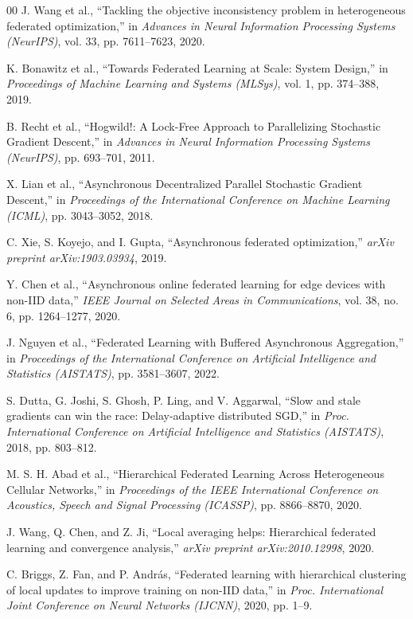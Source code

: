 \documentclass[conference]{IEEEtran}
\begin{document}
\begin{thebibliography}{00}
 J. Wang et al., ``Tackling the objective inconsistency problem in heterogeneous federated optimization,'' in \textit{Advances in Neural Information Processing Systems (NeurIPS)}, vol. 33, pp. 7611--7623, 2020.

 K. Bonawitz et al., ``Towards Federated Learning at Scale: System Design,'' in \textit{Proceedings of Machine Learning and Systems (MLSys)}, vol. 1, pp. 374--388, 2019.

 B. Recht et al., ``Hogwild!: A Lock-Free Approach to Parallelizing Stochastic Gradient Descent,'' in \textit{Advances in Neural Information Processing Systems (NeurIPS)}, pp. 693--701, 2011.

 X. Lian et al., ``Asynchronous Decentralized Parallel Stochastic Gradient Descent,'' in \textit{Proceedings of the International Conference on Machine Learning (ICML)}, pp. 3043--3052, 2018.

 C. Xie, S. Koyejo, and I. Gupta, ``Asynchronous federated optimization,'' \textit{arXiv preprint arXiv:1903.03934}, 2019.

 Y. Chen et al., ``Asynchronous online federated learning for edge devices with non-IID data,'' \textit{IEEE Journal on Selected Areas in Communications}, vol. 38, no. 6, pp. 1264--1277, 2020.

 J. Nguyen et al., ``Federated Learning with Buffered Asynchronous Aggregation,'' in \textit{Proceedings of the International Conference on Artificial Intelligence and Statistics (AISTATS)}, pp. 3581--3607, 2022.

 S. Dutta, G. Joshi, S. Ghosh, P. Ling, and V. Aggarwal, ``Slow and stale gradients can win the race: Delay-adaptive distributed SGD,'' in \textit{Proc. International Conference on Artificial Intelligence and Statistics (AISTATS)}, 2018, pp. 803--812.

 M. S. H. Abad et al., ``Hierarchical Federated Learning Across Heterogeneous Cellular Networks,'' in \textit{Proceedings of the IEEE International Conference on Acoustics, Speech and Signal Processing (ICASSP)}, pp. 8866--8870, 2020.

 J. Wang, Q. Chen, and Z. Ji, ``Local averaging helps: Hierarchical federated learning and convergence analysis,'' \textit{arXiv preprint arXiv:2010.12998}, 2020.

 C. Briggs, Z. Fan, and P. Andr\'{a}s, ``Federated learning with hierarchical clustering of local updates to improve training on non-IID data,'' in \textit{Proc. International Joint Conference on Neural Networks (IJCNN)}, 2020, pp. 1--9.


\end{thebibliography}
\end{document}
